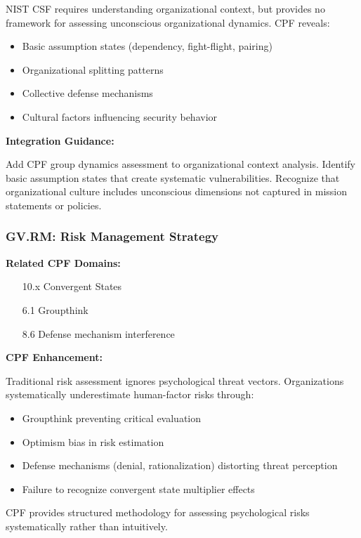 \documentclass[11pt,a4paper]{article}
\begin{document}
NIST CSF requires understanding organizational context, but provides no framework for assessing unconscious organizational dynamics. CPF reveals:

\begin{itemize}
\item Basic assumption states (dependency, fight-flight, pairing)
\item Organizational splitting patterns
\item Collective defense mechanisms
\item Cultural factors influencing security behavior
\end{itemize}

\textbf{Integration Guidance:}

Add CPF group dynamics assessment to organizational context analysis. Identify basic assumption states that create systematic vulnerabilities. Recognize that organizational culture includes unconscious dimensions not captured in mission statements or policies.

\subsubsection{GV.RM: Risk Management Strategy}

\textbf{Related CPF Domains:}
\begin{itemize}
\item [10.x] Convergent States
\item [6.1] Groupthink
\item [8.6] Defense mechanism interference
\end{itemize}

\textbf{CPF Enhancement:}

Traditional risk assessment ignores psychological threat vectors. Organizations systematically underestimate human-factor risks through:

\begin{itemize}
\item Groupthink preventing critical evaluation
\item Optimism bias in risk estimation
\item Defense mechanisms (denial, rationalization) distorting threat perception
\item Failure to recognize convergent state multiplier effects
\end{itemize}

CPF provides structured methodology for assessing psychological risks systematically rather than intuitively.
\end{document}
